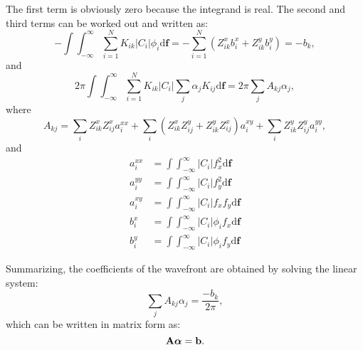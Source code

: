\documentclass[iop,onecolumn]{emulateapj}
\newcommand{\alphabold}{\mbox{\boldmath$\alpha$}}
\begin{document}
The first term is obviously zero because the integrand is real. The second and third terms can
be worked out and written as:
\begin{equation}
-\int \int_{-\infty}^{\infty} \sum_{i=1}^N K_{ik} |C_i| \phi_i \mathrm{d}\mathbf{f}
= -\sum_{i=1}^N \left( Z_{ik}^x b_i^x + Z_{ik}^y b_i^y \right) = -b_k,
\end{equation}
and
\begin{equation}
2\pi \int \int_{-\infty}^{\infty} \sum_{i=1}^N K_{ik} |C_i| \sum_j \alpha_j K_{ij} \mathrm{d}\mathbf{f}=
2\pi \sum_j A_{kj} \alpha_j,
\end{equation}
where
\begin{equation}
A_{kj} = \sum_i Z_{ik}^x Z_{ij}^x a^{xx}_i + \sum_i \left( Z_{ik}^x Z_{ij}^y + Z_{ik}^y Z_{ij}^x \right) a^{xy}_i + 
\sum_i Z_{ik}^y Z_{ij}^y a^{yy}_i,
\end{equation}
and
\begin{align}
a^{xx}_i &= \int \int_{-\infty}^{\infty} |C_i| f_x^2 \mathrm{d}\mathbf{f} \\
a^{yy}_i &= \int \int_{-\infty}^{\infty} |C_i| f_y^2 \mathrm{d}\mathbf{f} \\
a^{xy}_i &= \int \int_{-\infty}^{\infty} |C_i| f_x f_y \mathrm{d}\mathbf{f} \\
b^{x}_i &= \int \int_{-\infty}^{\infty} |C_i| \phi_i f_x \mathrm{d}\mathbf{f} \\
b^{y}_i &= \int \int_{-\infty}^{\infty} |C_i| \phi_i f_y \mathrm{d}\mathbf{f}
\end{align}

Summarizing, the coefficients of the wavefront are obtained by solving the 
linear system:
\begin{equation}
\sum_j A_{kj} \alpha_j = \frac{-b_k}{2\pi},
\end{equation}
which can be written in matrix form as:
\begin{equation}
\mathbf{A} \alphabold = \mathbf{b}.
\end{equation}



\end{document}
